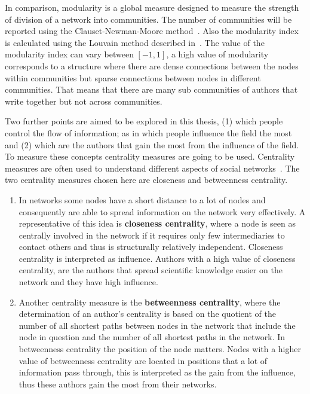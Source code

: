 In comparison, modularity is a global measure designed to measure the strength of
division of a network into communities. The number of communities will be reported
using the Clauset-Newman-Moore method~\cite{clauset2004}. Also the modularity index
is calculated using the Louvain method described in~\cite{Blondel2008}. The value
of the modularity index can vary between \([-1, 1]\), a high value of modularity
corresponds to a structure where there are dense connections between the nodes within
communities but sparse connections between nodes in different communities.
That means that there are many sub communities of authors that write together
but not across communities.

Two further points are aimed to be explored in this thesis, (1) which people control the flow
of information;
as in which people influence the field the most and (2) which are the authors that
gain the most from the influence of the field. To measure these concepts
centrality measures are going to be used.
Centrality measures are often used to understand different
aspects of social networks~\cite{Landherr2010}. The two centrality measures chosen
here are closeness and betweenness centrality.

\begin{enumerate}
    \item In networks some nodes have a short distance to a lot of nodes and
    consequently are able to spread information on the network very effectively.
    A representative of this idea is \textbf{closeness centrality}, where a node
    is seen as centrally involved in the network if it requires only few
    intermediaries to contact others and thus is structurally relatively
    independent. Closeness centrality is interpreted as influence. Authors with a high
    value of closeness centrality, are the authors that spread scientific
    knowledge easier on the network and they have high influence.
    \item Another centrality measure is the \textbf{betweenness centrality},
    where the determination of an author's centrality is based on the quotient
    of the number of all shortest paths between nodes in the network that
    include the node in question and the number of all shortest paths in the
    network. In betweenness centrality the position of the node matters. Nodes
    with a higher value of betweenness centrality are located in positions that
    a lot of information pass through, this is interpreted as the gain from
    the influence, thus these authors gain the most from their networks.
\end{enumerate}

